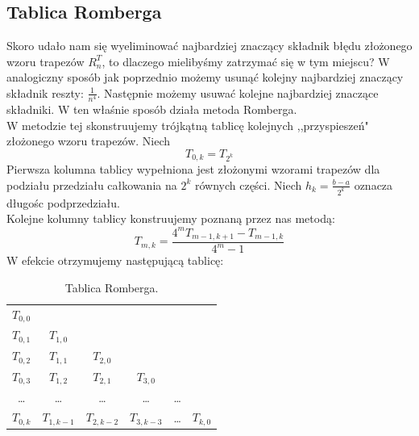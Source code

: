 \documentclass{article}
\begin{document}
\subsection{Tablica Romberga}
Skoro udało nam się wyeliminować najbardziej znaczący składnik błędu złożonego wzoru
trapezów $R_n^T$, to dlaczego mielibyśmy zatrzymać się w tym miejscu? W analogiczny sposób jak poprzednio możemy usunąć
kolejny najbardziej znaczący składnik reszty: $\frac{1}{n^4}$. Następnie możemy usuwać kolejne najbardziej znaczące
składniki. W ten właśnie sposób działa metoda Romberga. \\
W metodzie tej skonstruujemy trójkątną tablicę kolejnych ,,przyspieszeń" złożonego wzoru trapezów.
Niech
\begin{equation*}
T_{0,k} = T_{2^k}
\end{equation*}
Pierwsza kolumna tablicy wypełniona jest złożonymi wzorami trapezów dla podziału
przedziału całkowania na $2^k$ równych części. Niech $h_k = \frac{b - a}{2^k}$ oznacza długośc podprzedziału. \\
Kolejne kolumny tablicy konstruujemy poznaną przez nas metodą:
\begin{equation}
	T_{m,k} = \frac{4^m T_{m - 1, k + 1} - T_{m - 1, k}}{4^m - 1}
\end{equation}
W efekcie otrzymujemy następującą tablicę:

\begin{table}[h]
\centering
\begin{tabular}[c]{|c c c c c c|}
\hline
$T_{0,0}$ &  &  &  &  & \\
$T_{0,1}$ & $T_{1,0}$ &  &  & & \\
$T_{0,2}$ & $T_{1,1}$ & $T_{2,0}$ & & & \\
$T_{0,3}$ & $T_{1,2}$ & $T_{2,1}$ & $T_{3,0}$ &  &  \\
\dots & \dots & \dots & \dots & \dots & \\
$T_{0,k}$ & $T_{1,k - 1}$ & $T_{2,k - 2}$ & $T_{3,k - 3}$ & \dots & $T_{k,0}$ \\
\hline
\end{tabular}
\caption{Tablica Romberga.}
\end{table}
\end{document}
